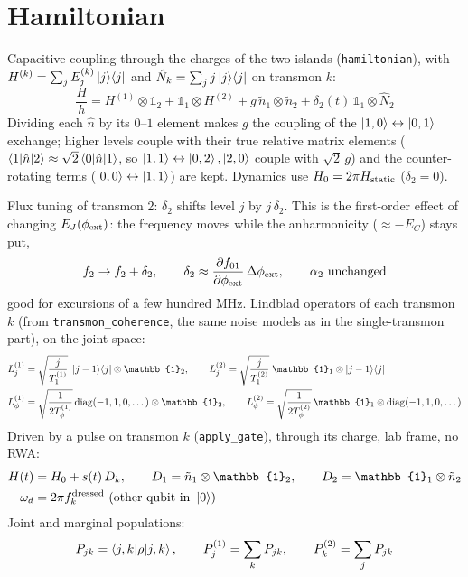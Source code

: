 \documentclass[11pt]{article}
\newcommand{\id}{\mathbb{1}}
\newcommand{\nq}{\tilde n}
\begin{document}
\section*{Hamiltonian}
Capacitive coupling through the charges of the two islands (\texttt{hamiltonian}), with
$H^{(k)} = \sum_j E^{(k)}_j\ket{j}\!\bra{j}$ and $\hat N_k = \sum_j j\ket{j}\!\bra{j}$ on transmon $k$:
\begin{equation}
  \frac{H}{h} = H^{(1)}\otimes\id_2 + \id_1\otimes H^{(2)}
     + g\,\nq_1\otimes\nq_2 + \delta_2(t)\,\id_1\otimes\hat N_2
\end{equation}
Dividing each $\hat n$ by its $0$--$1$ element makes $g$ the coupling of the
$\ket{1,0}\leftrightarrow\ket{0,1}$ exchange; higher levels couple with their true relative
matrix elements ($\braket{1|\hat n|2}\approx\sqrt2\braket{0|\hat n|1}$, so $\ket{1,1}\leftrightarrow
\ket{0,2},\ket{2,0}$ couple with $\sqrt2\,g$) and the counter-rotating terms
($\ket{0,0}\leftrightarrow\ket{1,1}$) are kept. Dynamics use $H_0 = 2\pi H_{\rm static}$
($\delta_2 = 0$).

Flux tuning of transmon 2: $\delta_2$ shifts level $j$ by $j\,\delta_2$. This is the first-order
effect of changing $E_J(\phi_{\rm ext})$: the frequency moves while the anharmonicity
($\approx -E_C$) stays put,
\begin{equation}
  f_2 \to f_2 + \delta_2, \qquad
  \delta_2 \approx \frac{\partial f_{01}}{\partial\phi_{\rm ext}}\,\Delta\phi_{\rm ext},
  \qquad \alpha_2 \ \text{unchanged}
\end{equation}
good for excursions of a few hundred MHz.
Lindblad operators of each transmon $k$ (from \texttt{transmon\_coherence}, the same noise
models as in the single-transmon part), on the joint space:
\begin{align}
  L^{(1)}_j &= \sqrt{\frac{j}{T_1^{(1)}}}\;\ket{j-1}\!\bra{j}\otimes\id_2, \qquad
  L^{(2)}_j = \sqrt{\frac{j}{T_1^{(2)}}}\;\id_1\otimes\ket{j-1}\!\bra{j} \\
  L^{(1)}_\phi &= \sqrt{\frac{1}{2T_\phi^{(1)}}}\,\mathrm{diag}(-1,1,0,\dots)\otimes\id_2, \qquad
  L^{(2)}_\phi = \sqrt{\frac{1}{2T_\phi^{(2)}}}\,\id_1\otimes\mathrm{diag}(-1,1,0,\dots)
\end{align}
Driven by a pulse on transmon $k$ (\texttt{apply\_gate}), through its charge, lab frame, no RWA:
\begin{align}
  H(t) &= H_0 + s(t)\,D_k, \qquad
  D_1 = \nq_1\otimes\id_2, \qquad D_2 = \id_1\otimes\nq_2 \\
  \omega_d &= 2\pi f_k^{\rm dressed}\ \text{(other qubit in } \ket{0})
\end{align}
Joint and marginal populations:
\begin{equation}
  P_{jk} = \braket{j,k|\rho|j,k}, \qquad
  P^{(1)}_j = \sum_k P_{jk}, \qquad P^{(2)}_k = \sum_j P_{jk}
\end{equation}
\end{document}
